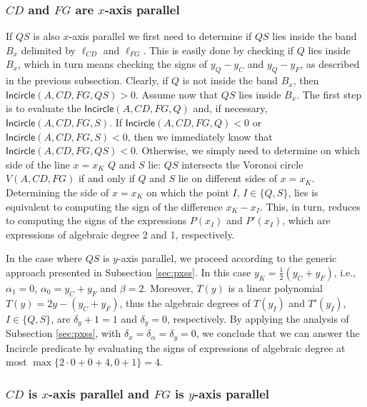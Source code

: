 \documentclass[letterpaper,11pt]{article}
\newcommand{\incircle}{\textsf{Incircle}\xspace}
\newcommand{\vor}{Voronoi\xspace}
\begin{document}
\subsubsection{$CD$ and $FG$ are $x$-axis parallel}\label{sec:psss-parallel}

If $QS$ is also $x$-axis parallel we first need to determine if $QS$
lies inside the band $B_x$ delimited by $\ell_{CD}$ and
$\ell_{FG}$. This is easily done by checking if $Q$ lies inside $B_x$,
which in turn means checking the signs of $y_Q-y_C$ and $y_Q-y_F$, as
described in the previous subsection. Clearly, if $Q$ is not inside
the band $B_x$, then $\incircle(A,CD,FG,QS)>0$.
Assume now that $QS$ lies inside $B_x$. The first step is to evaluate
the $\incircle(A,CD,FG,Q)$ and, if necessary,
$\incircle(A,CD,FG,S)$. If $\incircle(A,CD,FG,Q)<0$ or
$\incircle(A,CD,FG,S)<0$, then we immediately know that
$\incircle(A,CD,FG,QS)<0$. Otherwise, we simply need to determine on
which side of the line $x=x_K$ $Q$ and $S$ lie: $QS$ intersects the
\vor circle $V(A,CD,FG)$ if and only if $Q$ and $S$ lie on different
sides of $x=x_K$. Determining the side of $x=x_K$ on which the point
$I$, $I\in\{Q,S\}$, lies is equivalent to computing the sign of the
difference $x_K-x_I$. This, in turn, reduces to computing the
signs of the expressions $P(x_I)$ and $P'(x_I)$, which are
expressions of algebraic degree 2 and 1, respectively.

In the case where $QS$ is $y$-axis parallel, we proceed according to
the generic approach presented in Subsection \ref{sec:pxss}. In this
case $y_K=\frac{1}{2}(y_C+y_F)$, i.e., $\alpha_1=0$,
$\alpha_0=y_C+y_F$ and $\beta=2$. Moreover, $T(y)$ is a linear
polynomial $T(y)=2y-(y_C+y_F)$, thus the algebraic degrees of $T(y_I)$
and $T'(y_I)$, $I\in\{Q,S\}$, are $\delta_y+1=1$ and $\delta_y=0$,
respectively. By applying the analysis of Subsection \ref{sec:pxss},
with $\delta_x=\delta_\alpha=\delta_y=0$, 
we conclude that we can answer the \incircle predicate by evaluating
the signs of expressions of algebraic degree at most
$\max\{2\cdot{}0+0+4,0+1\}=4$.


\subsubsection{$CD$ is $x$-axis parallel and $FG$ is $y$-axis
  parallel}\label{sec:psss-vertical}
\end{document}
